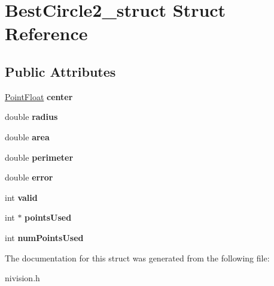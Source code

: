 \hypertarget{structBestCircle2__struct}{
\section{BestCircle2\_\-struct Struct Reference}
\label{structBestCircle2__struct}
}
\subsection*{Public Attributes}
\begin{DoxyCompactItemize}
\item 
\hypertarget{structBestCircle2__struct_a96290746002b0162064649423d17b668}{
\hyperlink{structPointFloat__struct}{PointFloat} {\bfseries center}}
\label{structBestCircle2__struct_a96290746002b0162064649423d17b668}

\item 
\hypertarget{structBestCircle2__struct_a0f89b21e2061967c5267b2bc56351e93}{
double {\bfseries radius}}
\label{structBestCircle2__struct_a0f89b21e2061967c5267b2bc56351e93}

\item 
\hypertarget{structBestCircle2__struct_a502588d492276f764b7ecae72797dc86}{
double {\bfseries area}}
\label{structBestCircle2__struct_a502588d492276f764b7ecae72797dc86}

\item 
\hypertarget{structBestCircle2__struct_a26ce04f3f98bec247def3981451a29ee}{
double {\bfseries perimeter}}
\label{structBestCircle2__struct_a26ce04f3f98bec247def3981451a29ee}

\item 
\hypertarget{structBestCircle2__struct_abbcacfd77c869ed6a63301ce5a71b797}{
double {\bfseries error}}
\label{structBestCircle2__struct_abbcacfd77c869ed6a63301ce5a71b797}

\item 
\hypertarget{structBestCircle2__struct_ad9be0b978c0382a74d0a3f5d69a56e4e}{
int {\bfseries valid}}
\label{structBestCircle2__struct_ad9be0b978c0382a74d0a3f5d69a56e4e}

\item 
\hypertarget{structBestCircle2__struct_a0057c6294478c454c2a6a485989b0d20}{
int $\ast$ {\bfseries pointsUsed}}
\label{structBestCircle2__struct_a0057c6294478c454c2a6a485989b0d20}

\item 
\hypertarget{structBestCircle2__struct_a030d0a3cb0f6fa598f6e6deaed288b97}{
int {\bfseries numPointsUsed}}
\label{structBestCircle2__struct_a030d0a3cb0f6fa598f6e6deaed288b97}

\end{DoxyCompactItemize}


The documentation for this struct was generated from the following file:\begin{DoxyCompactItemize}
\item 
nivision.h\end{DoxyCompactItemize}
